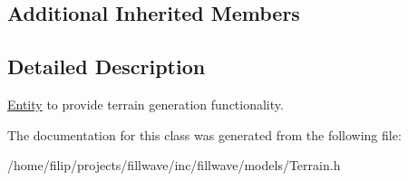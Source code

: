 \subsection*{Additional Inherited Members}


\subsection{Detailed Description}
\hyperlink{classflw_1_1flf_1_1Entity}{Entity} to provide terrain generation functionality. 

The documentation for this class was generated from the following file\+:\begin{DoxyCompactItemize}
\item 
/home/filip/projects/fillwave/inc/fillwave/models/Terrain.\+h\end{DoxyCompactItemize}
